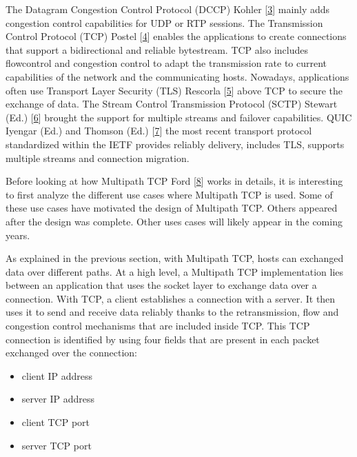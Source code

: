 \documentclass[letterpaper,10pt,english]{sphinxmanual}
\begin{document}
The Datagram Congestion Control Protocol (DCCP) Kohler  {[}\hyperlink{cite.biblio:id4244}{3}{]} mainly adds congestion control capabilities for UDP or RTP sessions.
The Transmission Control Protocol (TCP) Postel {[}\hyperlink{cite.biblio:id729}{4}{]} enables the applications to create connections that support a bidirectional and reliable bytestream. TCP also includes flow\sphinxhyphen{}control and congestion control to adapt the transmission rate to current capabilities of the network and the communicating hosts. Nowadays, applications often use Transport Layer Security (TLS) Rescorla {[}\hyperlink{cite.biblio:id8271}{5}{]} above TCP to secure the exchange of data. The Stream Control Transmission Protocol (SCTP) Stewart (Ed.) {[}\hyperlink{cite.biblio:id4847}{6}{]} brought the support for multiple streams and failover capabilities. QUIC Iyengar (Ed.) and Thomson (Ed.) {[}\hyperlink{cite.biblio:id8812}{7}{]} the most recent transport protocol standardized within the IETF provides reliably delivery, includes TLS, supports multiple streams and connection migration.

\sphinxAtStartPar
Before looking at how Multipath TCP Ford  {[}\hyperlink{cite.biblio:id6658}{8}{]} works in details, it is interesting to first analyze the different use cases where Multipath TCP is used. Some of these use cases have motivated the design of Multipath TCP. Others appeared after the design was complete. Other uses cases will likely appear in the coming years.

\sphinxAtStartPar
As explained in the previous section, with Multipath TCP, hosts can exchanged data over different paths. At a high level, a Multipath TCP implementation lies between an application that uses the socket layer to exchange data over a connection. With TCP, a client establishes a connection with a server. It then uses it to send and receive data reliably thanks to the retransmission, flow and congestion control mechanisms that are included inside TCP. This TCP connection is identified by using four fields that are present in each packet exchanged over the connection:
\begin{itemize}
\item {} 
\sphinxAtStartPar
client IP address

\item {} 
\sphinxAtStartPar
server IP address

\item {} 
\sphinxAtStartPar
client TCP port

\item {} 
\sphinxAtStartPar
server TCP port

\end{itemize}
\end{document}
